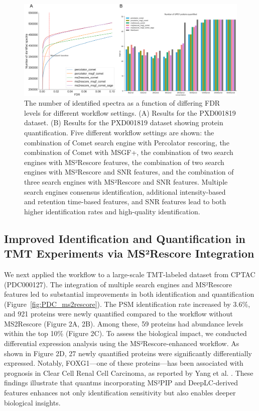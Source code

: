 \documentclass[12pt]{article}
\begin{document}
\begin{figure}[ht!]
	\centering
	\includegraphics[width=1\textwidth]{figures//PXD001819.png}
	\caption{The number of identified spectra as a function of differing FDR levels for different workflow settings. (A) Results for the PXD001819 dataset. (B) Results for the PXD001819 dataset showing protein quantification. Five different workflow settings are shown: the combination of Comet search engine with Percolator rescoring, the combination of Comet with MSGF+, the combination of two search engines with MS²Rescore features, the combination of two search engines with MS²Rescore and SNR features, and the combination of three search engines with MS²Rescore and SNR features. Multiple search engines consensus identification, additional intensity-based and retention time-based features, and SNR features lead to both higher identification rates and high-quality identification.}
	\label{fig:PXD001819_ms2rescore_pic}
\end{figure}

\subsection{Improved Identification and Quantification in TMT Experiments via MS²Rescore Integration}
We next applied the workflow to a large-scale TMT-labeled dataset from CPTAC (PDC000127). The integration of multiple search engines and MS²Rescore features led to substantial improvements in both identification and quantification (Figure~\ref{fig:PDC_ms2rescore}). The PSM identification rate increased by 3.6\%, and 921 proteins were newly quantified compared to the workflow without MS2Rescore (Figure 2A, 2B). Among these, 59 proteins had abundance levels within the top 10\% (Figure 2C). To assess the biological impact, we conducted differential expression analysis using the MS²Rescore-enhanced workflow. As shown in Figure 2D, 27 newly quantified proteins were significantly differentially expressed. Notably, FOXG1—one of these proteins—has been associated with prognosis in Clear Cell Renal Cell Carcinoma, as reported by Yang et al. \cite{yang_comprehensive_2022}. These findings illustrate that quantms incorporating MS²PIP and DeepLC-derived features enhances not only identification sensitivity but also enables deeper biological insights.
\end{document}
